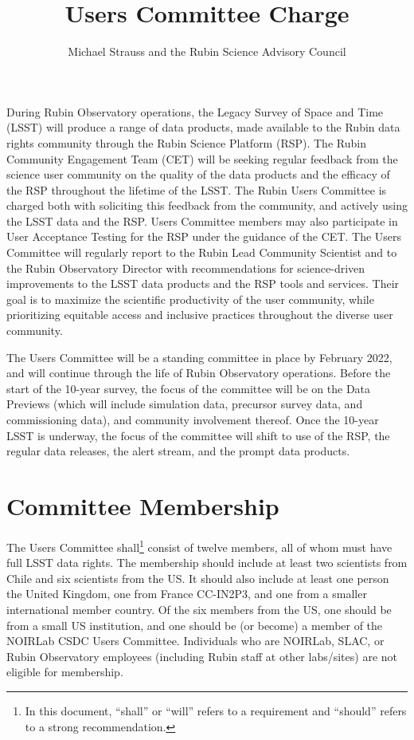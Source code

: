 \documentclass[OPS,toc]{lsstdoc}
\title{Users Committee Charge}
\author{%
Michael Strauss and the Rubin Science Advisory Council
}
\date{\vcsDate}
\begin{document}
\maketitle

During Rubin Observatory operations, the Legacy Survey of Space and Time (LSST) will produce a range of data products, made available to the Rubin data rights community through the Rubin Science Platform (RSP).
The Rubin Community Engagement Team (CET) will be seeking regular feedback from the science user community on the quality of the data products and the efficacy of the RSP throughout the lifetime of the LSST.
The Rubin Users Committee is charged both with soliciting this feedback from the community, and actively using the LSST data and the RSP.
Users Committee members may also participate in User Acceptance Testing for the RSP under the guidance of the CET.
The Users Committee will regularly report to the Rubin Lead Community Scientist and to the Rubin Observatory Director with recommendations for science-driven improvements to the LSST data products and the RSP tools and services.
Their goal is to maximize the scientific productivity of the user community, while prioritizing equitable access and inclusive practices throughout the diverse user community. 

The Users Committee will be a standing committee in place by February 2022, and will continue through the life of Rubin Observatory operations.
Before the start of the 10-year survey, the focus of the committee will be on the Data Previews (which will include simulation data, precursor survey data, and commissioning data), and community involvement thereof.
Once the 10-year LSST is underway, the focus of the committee will shift to use of the RSP, the regular data releases, the alert stream, and the prompt data products.  

\section{Committee Membership}

The Users Committee shall\footnote{In this document, “shall” or “will” refers to a requirement and “should” refers to a strong recommendation.} consist of twelve members, all of whom must have full LSST data rights.
The membership should include at least two scientists from Chile and six scientists from the US.
It should also include at least one person the United Kingdom, one from France CC-IN2P3, and one from a smaller international member country.
Of the six members from the US, one should be from a small US institution, and one should be (or become) a member of the NOIRLab CSDC Users Committee.
Individuals who are NOIRLab, SLAC, or Rubin Observatory employees (including Rubin staff at other labs/sites) are not eligible for membership. 
\end{document}
